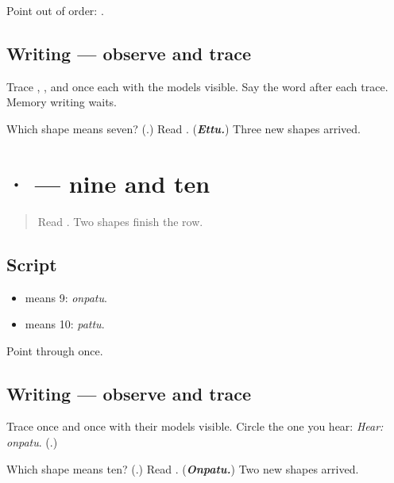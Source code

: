 Point out of order: \textbf{  }.

\subsection*{Writing — observe and trace}
Trace \textbf{}, \textbf{}, and \textbf{} once each with the models visible. Say the word after each trace. Memory writing waits.

\begin{tcolorbox}[breakable,colback=teal!4,colframe=teal!35!black,title={Before you move on}]
Which shape means seven? (\textbf{}.) Read \textbf{}. (\emph{\textbf{Ettu.}}) Three new shapes arrived.
\end{tcolorbox}
\section[\texorpdfstring{\ta{௯} \ta{௰} (nine, ten)}{௯ ௰ (nine, ten)}]{ ·  — nine and ten}

\label{lesson:TA-W07-digits-9-10}



\begin{quote}
Read \textbf{  }. Two shapes finish the row.
\end{quote}

\subsection*{Script}
\begin{itemize}
\raggedright
  \item \textbf{} means 9: \emph{onpatu}.
  \item \textbf{} means 10: \emph{pattu}.
\end{itemize}

Point through \textbf{    } once.

\subsection*{Writing — observe and trace}
Trace \textbf{} once and \textbf{} once with their models visible. Circle the one you hear: \emph{Hear:} \emph{onpatu}. (\textbf{}.)

\begin{tcolorbox}[breakable,colback=teal!4,colframe=teal!35!black,title={Before you move on}]
Which shape means ten? (\textbf{}.) Read \textbf{}. (\emph{\textbf{Onpatu.}}) Two new shapes arrived.
\end{tcolorbox}

